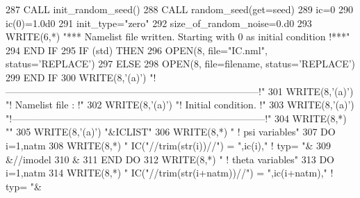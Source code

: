 \begin{DoxyCode}
{287       \textcolor{keyword}{CALL }init\_random\_seed()
288       \textcolor{keyword}{CALL }random\_seed(get=seed)
289       ic=0
290       ic(0)=1.0d0
291       init\_type=\textcolor{stringliteral}{"zero"}
292       size\_of\_random\_noise=0.d0
293       \textcolor{keyword}{WRITE}(6,*) \textcolor{stringliteral}{"*** Namelist file written. Starting with 0 as initial condition !***"}
294 \textcolor{keywordflow}{    END IF}
295     \textcolor{keywordflow}{IF} (std) \textcolor{keywordflow}{THEN}
296       \textcolor{keyword}{OPEN}(8, file=\textcolor{stringliteral}{"IC.nml"}, status=\textcolor{stringliteral}{'REPLACE'})
297     \textcolor{keywordflow}{ELSE}
298       \textcolor{keyword}{OPEN}(8, file=filename, status=\textcolor{stringliteral}{'REPLACE'})
299 \textcolor{keywordflow}{    END IF}
300     \textcolor{keyword}{WRITE}(8,\textcolor{stringliteral}{'(a)'}) \textcolor{stringliteral}{"!------------------------------------------------------------------------------!"}
301     \textcolor{keyword}{WRITE}(8,\textcolor{stringliteral}{'(a)'}) \textcolor{stringliteral}{"! Namelist file :                                                              !"}
302     \textcolor{keyword}{WRITE}(8,\textcolor{stringliteral}{'(a)'}) \textcolor{stringliteral}{"! Initial condition.                                                           !"}
303     \textcolor{keyword}{WRITE}(8,\textcolor{stringliteral}{'(a)'}) \textcolor{stringliteral}{"!------------------------------------------------------------------------------!"}
304     \textcolor{keyword}{WRITE}(8,*) \textcolor{stringliteral}{""}
305     \textcolor{keyword}{WRITE}(8,\textcolor{stringliteral}{'(a)'}) \textcolor{stringliteral}{"&ICLIST"}
306     \textcolor{keyword}{WRITE}(8,*) \textcolor{stringliteral}{" ! psi variables"}
307     \textcolor{keywordflow}{DO} i=1,natm
308       \textcolor{keyword}{WRITE}(8,*) \textcolor{stringliteral}{" IC("}//trim(str(i))//\textcolor{stringliteral}{") = "},ic(i),\textcolor{stringliteral}{"   ! typ= "}&
309         &//imodel%
310         &%
311 \textcolor{keywordflow}{    END DO}
312     \textcolor{keyword}{WRITE}(8,*) \textcolor{stringliteral}{" ! theta variables"}
313     \textcolor{keywordflow}{DO} i=1,natm
314       \textcolor{keyword}{WRITE}(8,*) \textcolor{stringliteral}{" IC("}//trim(str(i+natm))//\textcolor{stringliteral}{") = "},ic(i+natm),\textcolor{stringliteral}{"   ! typ= "}&
}
\end{DoxyCode}
